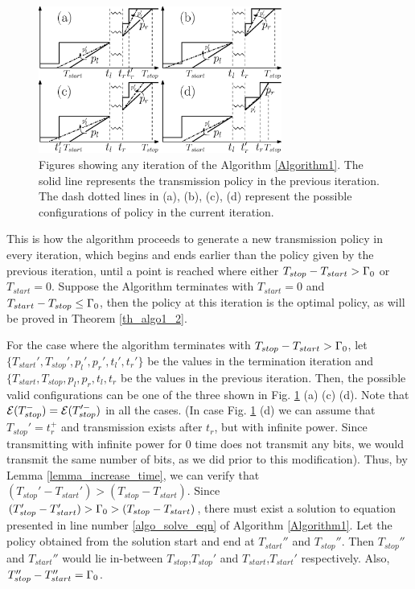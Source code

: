 \begin{figure}
\centering
  \centerline{\includegraphics[width=8cm]{Algorithm1.eps}}
\caption{Figures showing any iteration of the Algorithm \ref{Algorithm1}. The solid line represents the transmission policy in the previous iteration. The dash dotted lines in (a), (b), (c), (d) represent the possible configurations of policy in the current iteration.}\label{figure_Algorithm1}
\end{figure}

This is how the algorithm proceeds to generate a new transmission policy in every iteration, which begins and ends earlier than the policy given by the previous iteration, until a point is reached where either $T_{stop}-T_{start}>\Gamma_0$ or $T_{start}=0$. Suppose the Algorithm terminates with $T_{start}=0$ and $T_{start}-T_{stop}\le\Gamma_0$, then the policy at this iteration is the optimal policy, as will be proved in Theorem \ref{th_algo1_2}. 


For the case where the algorithm terminates with $T_{stop}-T_{start}>\Gamma_0$, let $\{T_{start}',T_{stop}',p_l',p_r',t_l',t_r'\}$ be the values in the termination iteration and $\{T_{start},T_{stop},p_l,p_r,t_l,t_r$ be the values in the previous iteration. Then, the possible valid configurations can be one of the three shown in Fig. \ref{figure_Algorithm1} (a) (c) (d). Note that $\mathcal{E}(T_{stop}^-)=\mathcal{E}(T_{stop}'^-)$ in all the cases. (In case Fig. \ref{figure_Algorithm1} (d) we can assume that $T_{stop}'=t_r^+$ and transmission exists after $t_r$, but with infinite power. Since transmitting with infinite power for $0$ time does not transmit any bits, we would transmit the same number of bits, as we did prior to this modification). Thus, by Lemma \ref{lemma_increase_time}, we can verify that $(T_{stop}'-T_{start}')>(T_{stop}-T_{start})$. Since $(T_{stop}'-T_{start}')>\Gamma_0>(T_{stop}-T_{start})$, there must exist a solution to equation presented in line number \ref{algo_solve_eqn} of Algorithm \ref{Algorithm1}. Let the policy obtained from the solution start and end at $T_{start}''$ and $T_{stop}''$. Then $T_{stop}''$ and $T_{start}''$ would lie in-between $T_{stop}$,$T_{stop}'$ and $T_{start}$,$T_{start}'$ respectively. Also, $T_{stop}''-T_{start}''=\Gamma_0$.

